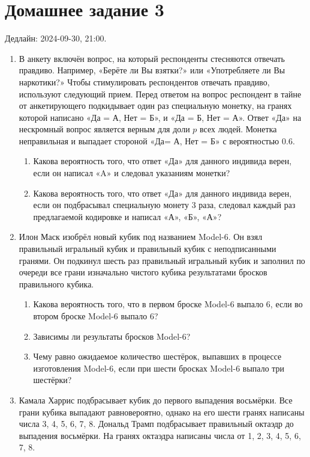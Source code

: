 \section*{Домашнее задание 3}

Дедлайн: 2024-09-30, 21:00.

\begin{enumerate}

\item В анкету включён вопрос, на который респонденты стесняются отвечать правдиво. 
Например, «Берёте ли Вы взятки?» или «Употребляете ли Вы наркотики?»
Чтобы стимулировать респондентов отвечать правдиво, используют следующий прием. 
Перед ответом на вопрос респондент в тайне от анкетирующего подкидывает один раз специальную монетку, на гранях которой написано «Да = А, Нет = Б»,
и «Да = Б, Нет = А». 
Ответ «Да» на нескромный вопрос является верным для доли $p$ всех людей. 
Монетка неправильная и выпадает стороной «Да= А, Нет = Б» с вероятностью $0.6$.

\begin{enumerate}
    \item Какова вероятность того, что ответ «Да» для данного индивида верен, если он написал «A» и следовал указаниям монетки?
    \item Какова вероятность того, что ответ «Да» для данного индивида верен, если он подбрасывал специальную монету 3 раза,
    следовал каждый раз предлагаемой кодировке и написал «А», «Б», «А»?
\end{enumerate}

\item Илон Маск изобрёл новый кубик под названием Model-6. 
Он взял правильный игральный кубик и правильный кубик с неподписанными гранями. 
Он подкинул шесть раз правильный игральный кубик и заполнил по очереди все грани изначально чистого кубика результатами бросков правильного кубика.
\begin{enumerate}
    \item Какова вероятность того, что в первом броске Model-6 выпало 6, если во втором броске Model-6 выпало 6?
    \item Зависимы ли результаты бросков Model-6?
    \item Чему равно ожидаемое количество шестёрок, выпавших в процессе изготовления Model-6, если при шести бросках Model-6 выпало три шестёрки?
\end{enumerate}

\item Камала Харрис подбрасывает кубик до первого выпадения восьмёрки.
Все грани кубика выпадают равновероятно, однако на его шести гранях написаны числа 3, 4, 5, 6, 7, 8.
Дональд Трамп подбрасывает правильный октаэдр до выпадения восьмёрки. 
На гранях октаэдра написаны числа от 1, 2, 3, 4, 5, 6, 7, 8.


\end{enumerate}
